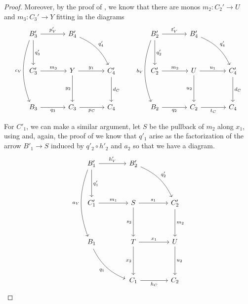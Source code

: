 \begin{proof}
	Moreover, by the proof of , we know that there are monos $m_2:C_2'\to U$ and $m_3:C_3'\to Y$ fitting in the diagrams
	\[\begin{tikzcd}[row sep=18, column sep = 18]
	{B'_3} && {B'_4} \\
	\\
	{C'_3} && Y && {C'_4} \\
	\\
	{B_3} && {C_3} && {C_4}
	\arrow["{p'_V}", from=1-1, to=1-3]
	\arrow["{q'_3}", from=1-1, to=3-1]
	\arrow["{q'_4}", from=1-3, to=3-5, bend left = 20]
	\arrow["{m_3}", from=3-1, to=3-3]
	\arrow["{y_1}", from=3-3, to=3-5]
	\arrow["{y_2}"', from=3-3, to=5-3]
	\arrow["{d_C}", from=3-5, to=5-5]
	\arrow["{q_3}"', from=5-1, to=5-3]
	\arrow["{p_C}"', from=5-3, to=5-5]
        \arrow["{c_V}"', from=1-1, to=5-1, bend right = 20, shift right=1]
	\end{tikzcd}\qquad\begin{tikzcd}[row sep=18, column sep = 18]
	{B'_2} && {B'_4} \\
	\\
	{C'_2} && U && {C'_4} \\
	\\
	{B_2} && {C_2} && {C_4}
	\arrow["{t'_V}", from=1-1, to=1-3]
	\arrow["{q'_2}", from=1-1, to=3-1]
	\arrow["{q'_4}", from=1-3, to=3-5, bend left = 20]
	\arrow["{m_2}", from=3-1, to=3-3]
	\arrow["{u_1}", from=3-3, to=3-5]
	\arrow["{u_2}"', from=3-3, to=5-3]
	\arrow["{d_C}", from=3-5, to=5-5]
	\arrow["{q_2}"', from=5-1, to=5-3]
	\arrow["{t_C}"', from=5-3, to=5-5]
        \arrow["{b_V}"', from=1-1, to=5-1, bend right = 20, shift right = 1]
	\end{tikzcd}\]

	For $C'_1$, we can make a similar argument, let $S$ be the pullback of $m_2$ along $x_1$, using  and, again, the proof of  we know that $q'_1$ arise as the factorization of the arrow $B'_1\to S$ induced by $q'_2\circ h'_2$ and $a_2$ so that we have a diagram.
	\[\begin{tikzcd}[row sep = 20, column sep =20]
	{B'_1} && {B'_2} \\
	\\
	{C'_1} && S && {C'_2} \\
	\\
	{B_1} && T && U \\
	\\
	&& {C_1} && {C_2}
	\arrow["{h'_V}", from=1-1, to=1-3]
	\arrow["{q'_1}", from=1-1, to=3-1]
	\arrow["{q'_2}", from=1-3, to=3-5, bend left = 20]
	\arrow["{m_1}", from=3-1, to=3-3]
	\arrow["{s_1}", from=3-3, to=3-5]
	\arrow["{s_2}"', from=3-3, to=5-3]
	\arrow["{m_2}", from=3-5, to=5-5]
	\arrow["{q_1}"', from=5-1, to=7-3, bend right = 20, shift right = 1]
	\arrow["{x_1}", from=5-3, to=5-5]
	\arrow["{x_2}"', from=5-3, to=7-3]
	\arrow["{u_2}", from=5-5, to=7-5]
	\arrow["{h_C}"', from=7-3, to=7-5]
        \arrow["{a_V}"', from=1-1, to=5-1, bend right = 20, shift right = 1]
	\end{tikzcd}\]
	

\end{proof}
